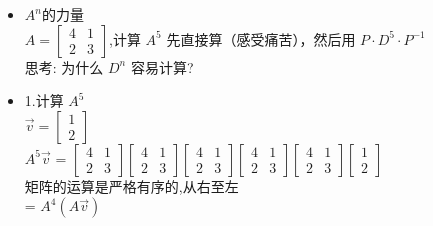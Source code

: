 \documentclass[12pt]{article}
\begin{document}
\begin{flushleft}
    \begin{itemize}
        \item $A^{n}$的力量 \\
              $A = \begin{bmatrix}
                      4 & 1 \\
                      2 & 3
                  \end{bmatrix}$,计算 $A^{5}$ 先直接算（感受痛苦），然后用 $P\cdot D^{5} \cdot P^{-1}$\\
              思考: 为什么 $D^{n}$ 容易计算?
        \item 1.计算 $A^{5}$ \\
              $\vec{v} = \begin{bmatrix}
                      1 \\
                      2
                  \end{bmatrix}$\\
              $A^{5}\vec{v}$ =  $
                  \begin{bmatrix}
                      4 & 1 \\
                      2 & 3
                  \end{bmatrix}\begin{bmatrix}
                      4 & 1 \\
                      2 & 3
                  \end{bmatrix}\begin{bmatrix}
                      4 & 1 \\
                      2 & 3
                  \end{bmatrix}\begin{bmatrix}
                      4 & 1 \\
                      2 & 3
                  \end{bmatrix}\begin{bmatrix}
                      4 & 1 \\
                      2 & 3
                  \end{bmatrix}\begin{bmatrix}
                      1 \\
                      2
                  \end{bmatrix}$ \\
              矩阵的运算是严格有序的,从右至左 \\
              = $A^{4}(A\vec{v})$ \\

\end{itemize}
\end{flushleft}
\end{document}
